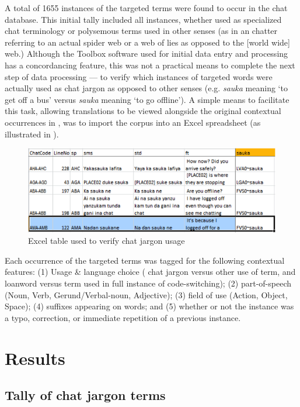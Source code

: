 \documentclass[output=paper
,newtxmath
,modfonts
,nonflat]{langsci/langscibook}
\begin{document}
A total of 1655 instances of the targeted terms were found to occur in the  chat database. This initial tally included all instances, whether used as specialized chat terminology or polysemous terms used in other senses (as in an  chatter referring to an actual spider web or a web of lies as opposed to the [world wide] web.) Although the Toolbox software used for initial data entry and processing has a concordancing feature, this was not a practical means to complete the next step of data processing — to verify which instances of targeted words were actually used as chat jargon as opposed to other senses (e.g. \textit{sauka} meaning ‘to get off a bus’ versus \textit{sauka} meaning ‘to go offline’). A simple means to facilitate this task, allowing  translations to be viewed alongside the original contextual occurrences in , was to import the corpus into an Excel spreadsheet (as illustrated in ).

  

\begin{figure}
\includegraphics[width=\textwidth]{figures/purvis-fig2.png}
\caption{Excel table used to verify chat jargon usage}
\label{fig:purvis:2}
\end{figure} 

Each occurrence of the targeted terms was tagged for the following contextual features: (1) Usage \& language choice ( chat jargon versus other use of  term, and  loanword versus  term used in full instance of code-switching); (2) part-of-speech (Noun, Verb, Gerund/Verbal-noun, Adjective); (3) field of use (Action, Object, Space); (4)  suffixes appearing on words; and (5) whether or not the instance was a typo, correction, or immediate repetition of a previous instance. 

\section{Results}\label{sec:purvis:4}
\subsection{Tally of chat jargon terms}
\end{document}
